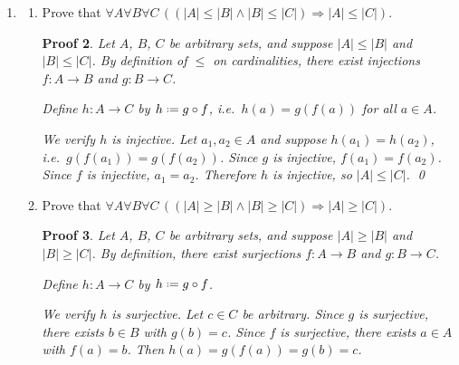 \documentclass[12pt]{article}
\newcommand{\defeq}{\mathrel{\vcenter{\baselineskip0.5ex \lineskiplimit0pt
                     \hbox{\scriptsize.}\hbox{\scriptsize.}}}=}
\newcommand{\id}{\mathrm{id}}
\theoremstyle{proofstyle}
\newtheorem*{proof*}{Proof}
\begin{document}
\begin{enumerate}[left=0pt, itemsep=2em, parsep=1em]
\begin{enumerate}[label=(\alph*), itemsep=1.5em, leftmargin=2em]
\begin{proof*}
  We verify $g \circ f = \id_X$. Let $x \in X$ be arbitrary. Then $f(x) \in Y$ and $x$ itself witnesses $\exists x' \in X$ s.t.\ $f(x') = f(x)$, so $g(f(x)) = x$ by definition of $g$. Therefore:
  \[
    (g \circ f)(x) = g(f(x)) = x = \id_X(x).
  \]
  Since $x$ was arbitrary, $g \circ f = \id_X$. \qed
  \end{proof*}

\end{enumerate}

\newpage

\item
\begin{enumerate}[label=(\alph*), itemsep=1.5em, leftmargin=2em]

  \item Prove that $\forall A \forall B \forall C\,((|A| \leq |B| \land |B| \leq |C|) \Rightarrow |A| \leq |C|)$.

  \begin{proof*}
  Let $A$, $B$, $C$ be arbitrary sets, and suppose $|A| \leq |B|$ and $|B| \leq |C|$. By definition of $\leq$ on cardinalities, there exist injections $f : A \to B$ and $g : B \to C$.

  Define $h : A \to C$ by $h \defeq g \circ f$, i.e.\ $h(a) = g(f(a))$ for all $a \in A$.

  We verify $h$ is injective. Let $a_1, a_2 \in A$ and suppose $h(a_1) = h(a_2)$, i.e.\ $g(f(a_1)) = g(f(a_2))$. Since $g$ is injective, $f(a_1) = f(a_2)$. Since $f$ is injective, $a_1 = a_2$. Therefore $h$ is injective, so $|A| \leq |C|$. \qed
  \end{proof*}

  \item Prove that $\forall A \forall B \forall C\,((|A| \geq |B| \land |B| \geq |C|) \Rightarrow |A| \geq |C|)$. 

  \begin{proof*}
  Let $A$, $B$, $C$ be arbitrary sets, and suppose $|A| \geq |B|$ and $|B| \geq |C|$. By definition, there exist surjections $f : A \to B$ and $g : B \to C$.
 
  Define $h : A \to C$ by $h \defeq g \circ f$.
 
  We verify $h$ is surjective. Let $c \in C$ be arbitrary. Since $g$ is surjective, there exists $b \in B$ with $g(b) = c$. Since $f$ is surjective, there exists $a \in A$ with $f(a) = b$. Then $h(a) = g(f(a)) = g(b) = c$.
 

\end{proof*}
\end{enumerate}
\end{enumerate}
\end{document}

